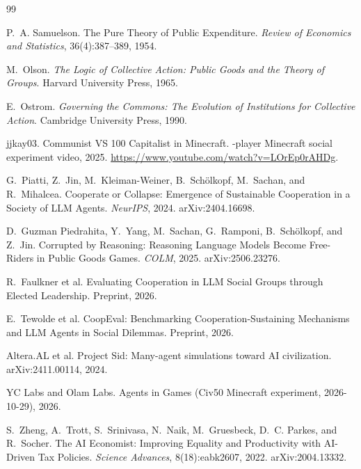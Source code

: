 \documentclass[10pt,letterpaper]{article}
\begin{document}
\begin{thebibliography}{99}

P.~A. Samuelson.
\newblock The Pure Theory of Public Expenditure.
\newblock \emph{Review of Economics and Statistics}, 36(4):387--389, 1954.

M.~Olson.
\newblock \emph{The Logic of Collective Action: Public Goods and the Theory of Groups}.
\newblock Harvard University Press, 1965.

E.~Ostrom.
\newblock \emph{Governing the Commons: The Evolution of Institutions for Collective Action}.
\newblock Cambridge University Press, 1990.

jjkay03.
 Communist VS 100 Capitalist in Minecraft.
-player Minecraft social experiment video, 2025. \url{https://www.youtube.com/watch?v=LOrEp0rAHDg}.

G.~Piatti, Z.~Jin, M.~Kleiman-Weiner, B.~Sch\"olkopf, M.~Sachan, and R.~Mihalcea.
\newblock Cooperate or Collapse: Emergence of Sustainable Cooperation in a Society of LLM Agents.
\newblock \emph{NeurIPS}, 2024. arXiv:2404.16698.

D.~Guzman Piedrahita, Y.~Yang, M.~Sachan, G.~Ramponi, B.~Sch\"olkopf, and Z.~Jin.
\newblock Corrupted by Reasoning: Reasoning Language Models Become Free-Riders in Public Goods Games.
\newblock \emph{COLM}, 2025. arXiv:2506.23276.

R.~Faulkner et al.
\newblock Evaluating Cooperation in LLM Social Groups through Elected Leadership.
\newblock Preprint, 2026.

E.~Tewolde et al.
\newblock CoopEval: Benchmarking Cooperation-Sustaining Mechanisms and LLM Agents in Social Dilemmas.
\newblock Preprint, 2026.

Altera.AL et al.
\newblock Project Sid: Many-agent simulations toward AI civilization.
\newblock arXiv:2411.00114, 2024.

YC Labs and Olam Labs.
\newblock Agents in Games (Civ50 Minecraft experiment, 2026-10-29), 2026.

S.~Zheng, A.~Trott, S.~Srinivasa, N.~Naik, M.~Gruesbeck, D.~C. Parkes, and R.~Socher.
\newblock The AI Economist: Improving Equality and Productivity with AI-Driven Tax Policies.
\newblock \emph{Science Advances}, 8(18):eabk2607, 2022. arXiv:2004.13332.


\end{thebibliography}
\end{document}
